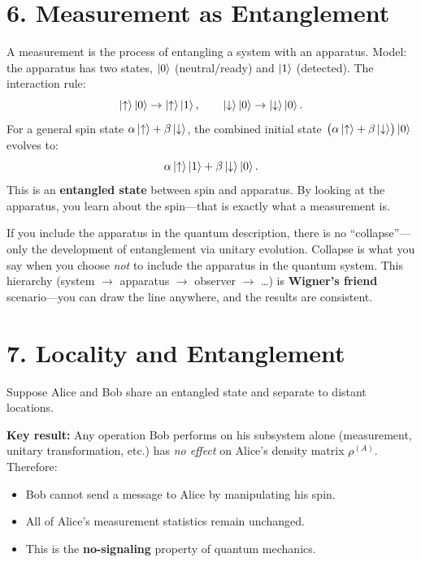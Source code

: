 \documentclass[12pt,a4paper]{article}
\begin{document}
\section{6. Measurement as Entanglement}

A measurement is the process of entangling a system with an apparatus.  Model: the apparatus has two states, $\ket{0}$ (neutral/ready) and $\ket{1}$ (detected).  The interaction rule:
\[
    \ket{\uparrow}\ket{0} \to \ket{\uparrow}\ket{1}, \qquad
    \ket{\downarrow}\ket{0} \to \ket{\downarrow}\ket{0}.
\]
For a general spin state $\alpha\ket{\uparrow}+\beta\ket{\downarrow}$, the combined initial state $\bigl(\alpha\ket{\uparrow}+\beta\ket{\downarrow}\bigr)\ket{0}$ evolves to:
\[
    \alpha\ket{\uparrow}\ket{1} + \beta\ket{\downarrow}\ket{0}.
\]
This is an \textbf{entangled state} between spin and apparatus.  By looking at the apparatus, you learn about the spin---that is exactly what a measurement is.

If you include the apparatus in the quantum description, there is no ``collapse''---only the development of entanglement via unitary evolution.  Collapse is what you say when you choose \emph{not} to include the apparatus in the quantum system.  This hierarchy (system $\to$ apparatus $\to$ observer $\to$ \ldots) is \textbf{Wigner's friend} scenario---you can draw the line anywhere, and the results are consistent.

\section{7. Locality and Entanglement}

Suppose Alice and Bob share an entangled state and separate to distant locations.

\noindent\textbf{Key result:} Any operation Bob performs on his subsystem alone (measurement, unitary transformation, etc.) has \emph{no effect} on Alice's density matrix $\rho^{(A)}$.  Therefore:
\begin{itemize}[nosep]
    \item Bob cannot send a message to Alice by manipulating his spin.
    \item All of Alice's measurement statistics remain unchanged.
    \item This is the \textbf{no-signaling} property of quantum mechanics.
\end{itemize}
\end{document}
